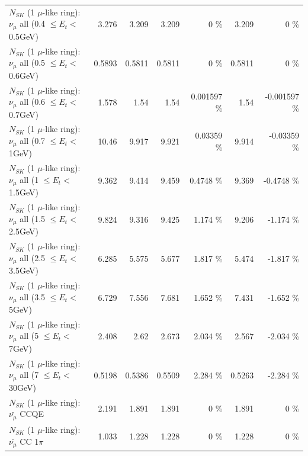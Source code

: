 \begin{table}
\begin{tabular}{| l | r | r | r  r | r  r |}
       $N_{SK}$ (1 $\mu$-like ring): $\nu_{\mu}$ all (0.4 $\leq E_{t} <$ 0.5GeV) &           3.276 &           3.209 &           3.209 &        0 \%  &           3.209 &        0 \%  \\ 
       $N_{SK}$ (1 $\mu$-like ring): $\nu_{\mu}$ all (0.5 $\leq E_{t} <$ 0.6GeV) &          0.5893 &          0.5811 &          0.5811 &        0 \%  &          0.5811 &        0 \%  \\ 
       $N_{SK}$ (1 $\mu$-like ring): $\nu_{\mu}$ all (0.6 $\leq E_{t} <$ 0.7GeV) &           1.578 &            1.54 &            1.54 & 0.001597 \%  &            1.54 & -0.001597 \%  \\ 
         $N_{SK}$ (1 $\mu$-like ring): $\nu_{\mu}$ all (0.7 $\leq E_{t} <$ 1GeV) &           10.46 &           9.917 &           9.921 &  0.03359 \%  &           9.914 & -0.03359 \%  \\ 
         $N_{SK}$ (1 $\mu$-like ring): $\nu_{\mu}$ all (1 $\leq E_{t} <$ 1.5GeV) &           9.362 &           9.414 &           9.459 &   0.4748 \%  &           9.369 &  -0.4748 \%  \\ 
       $N_{SK}$ (1 $\mu$-like ring): $\nu_{\mu}$ all (1.5 $\leq E_{t} <$ 2.5GeV) &           9.824 &           9.316 &           9.425 &    1.174 \%  &           9.206 &   -1.174 \%  \\ 
       $N_{SK}$ (1 $\mu$-like ring): $\nu_{\mu}$ all (2.5 $\leq E_{t} <$ 3.5GeV) &           6.285 &           5.575 &           5.677 &    1.817 \%  &           5.474 &   -1.817 \%  \\ 
         $N_{SK}$ (1 $\mu$-like ring): $\nu_{\mu}$ all (3.5 $\leq E_{t} <$ 5GeV) &           6.729 &           7.556 &           7.681 &    1.652 \%  &           7.431 &   -1.652 \%  \\ 
           $N_{SK}$ (1 $\mu$-like ring): $\nu_{\mu}$ all (5 $\leq E_{t} <$ 7GeV) &           2.408 &            2.62 &           2.673 &    2.034 \%  &           2.567 &   -2.034 \%  \\ 
          $N_{SK}$ (1 $\mu$-like ring): $\nu_{\mu}$ all (7 $\leq E_{t} <$ 30GeV) &          0.5198 &          0.5386 &          0.5509 &    2.284 \%  &          0.5263 &   -2.284 \%  \\ 
\hline
\hline
\hline
                              $N_{SK}$ (1 $\mu$-like ring): $\bar{\nu_\mu}$ CCQE &           2.191 &           1.891 &           1.891 &        0 \%  &           1.891 &        0 \%  \\ 
                         $N_{SK}$ (1 $\mu$-like ring): $\bar{\nu_\mu}$ CC 1$\pi$ &           1.033 &           1.228 &           1.228 &        0 \%  &           1.228 &        0 \%  \\ 

\end{tabular}
\end{table}
